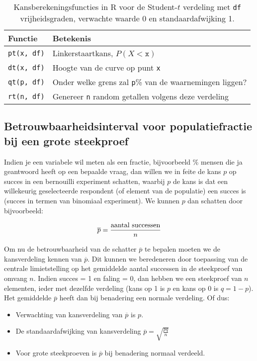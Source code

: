 \begin{table}
  \centering
  \begin{tabular}{ll}
  	\textbf{Functie} & \textbf{Betekenis}                                             \\ \midrule
  	\verb|pt(x, df)| & Linkerstaartkans, $P(X<\mathtt{x})$                            \\
  	\verb|dt(x, df)| & Hoogte van de curve op punt \texttt{x}                         \\
  	\verb|qt(p, df)| & Onder welke grens zal \texttt{p}\% van de waarnemingen liggen? \\
  	\verb|rt(n, df)| & Genereer \texttt{n} random getallen volgens deze verdeling
  \end{tabular}

  \caption{Kansberekeningsfuncties in R voor de Student-$t$ verdeling met \texttt{df} vrijheidsgraden, verwachte waarde 0 en standaardafwijking 1.}
  \label{tab:t-prob-r}
\end{table}

\subsection{Betrouwbaarheidsinterval voor populatiefractie bij een grote steekproef}
\label{ssec:betrouwbaarheidsinterval-populatiefractie}

Indien je een variabele wil meten als een fractie, bijvoorbeeld \% mensen die ja geantwoord heeft op een bepaalde vraag, dan willen we in feite de kans $p$ op succes in een bernouilli experiment schatten, waarbij $p$ de kans is dat een willekeurig geselecteerde respondent (of element van de populatie) een succes is (succes in termen van binomiaal experiment). We kunnen $p$ dan schatten door bijvoorbeeld:

\[ \overline{p} = \frac{\textnormal{aantal successen}}{n} \]

Om nu de betrouwbaarheid van de schatter $\overline{p}$ te bepalen moeten we de kansverdeling kennen van $\overline{p}$. Dit kunnen we beredeneren door toepassing van de centrale limietstelling op het gemiddelde aantal successen in de steekproef van omvang $n$. Indien succes = 1 en faling = 0, dan hebben we een steekproef van $n$ elementen, ieder met dezelfde verdeling (kans op 1 is $p$ en kans op 0 is $q=1-p$).  Het gemiddelde $\overline{p}$ heeft dan bij benadering een normale verdeling. Of dus:

\begin{itemize}
  \item Verwachting van kansverdeling van $\overline{p}$ is $p$.
  \item De standaardafwijking van kansverdeling $\overline{p} = \sqrt{\frac{pq}{n}}$
  \item Voor grote steekproeven is $\overline{p}$ bij benadering normaal verdeeld.
\end{itemize}

